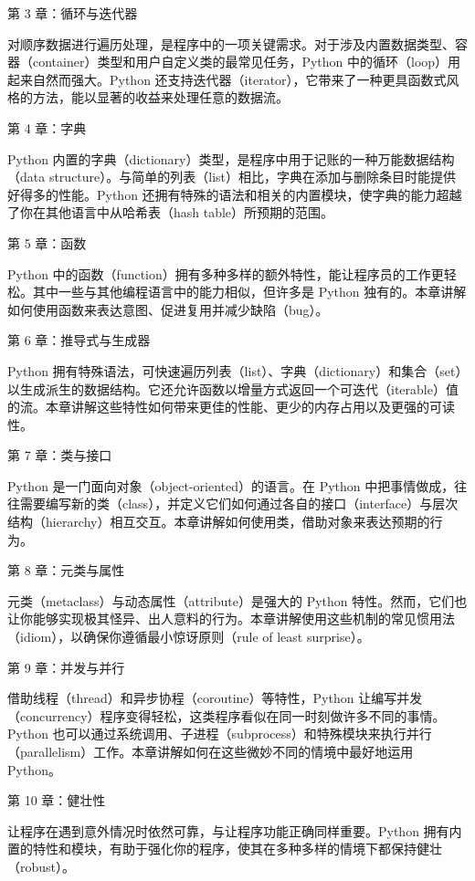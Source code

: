 第 3 章：循环与迭代器

对顺序数据进行遍历处理，是程序中的一项关键需求。对于涉及内置数据类型、容器（container）类型和用户自定义类的最常见任务，Python 中的循环（loop）用起来自然而强大。Python 还支持迭代器（iterator），它带来了一种更具函数式风格的方法，能以显著的收益来处理任意的数据流。

第 4 章：字典

Python 内置的字典（dictionary）类型，是程序中用于记账的一种万能数据结构（data structure）。与简单的列表（list）相比，字典在添加与删除条目时能提供好得多的性能。Python 还拥有特殊的语法和相关的内置模块，使字典的能力超越了你在其他语言中从哈希表（hash table）所预期的范围。

第 5 章：函数

Python 中的函数（function）拥有多种多样的额外特性，能让程序员的工作更轻松。其中一些与其他编程语言中的能力相似，但许多是 Python 独有的。本章讲解如何使用函数来表达意图、促进复用并减少缺陷（bug）。

第 6 章：推导式与生成器

Python 拥有特殊语法，可快速遍历列表（list）、字典（dictionary）和集合（set）以生成派生的数据结构。它还允许函数以增量方式返回一个可迭代（iterable）值的流。本章讲解这些特性如何带来更佳的性能、更少的内存占用以及更强的可读性。

第 7 章：类与接口

Python 是一门面向对象（object-oriented）的语言。在 Python 中把事情做成，往往需要编写新的类（class），并定义它们如何通过各自的接口（interface）与层次结构（hierarchy）相互交互。本章讲解如何使用类，借助对象来表达预期的行为。

第 8 章：元类与属性

元类（metaclass）与动态属性（attribute）是强大的 Python 特性。然而，它们也让你能够实现极其怪异、出人意料的行为。本章讲解使用这些机制的常见惯用法（idiom），以确保你遵循最小惊讶原则（rule of least surprise）。

第 9 章：并发与并行

借助线程（thread）和异步协程（coroutine）等特性，Python 让编写并发（concurrency）程序变得轻松，这类程序看似在同一时刻做许多不同的事情。Python 也可以通过系统调用、子进程（subprocess）和特殊模块来执行并行（parallelism）工作。本章讲解如何在这些微妙不同的情境中最好地运用 Python。

第 10 章：健壮性

让程序在遇到意外情况时依然可靠，与让程序功能正确同样重要。Python 拥有内置的特性和模块，有助于强化你的程序，使其在多种多样的情境下都保持健壮（robust）。

